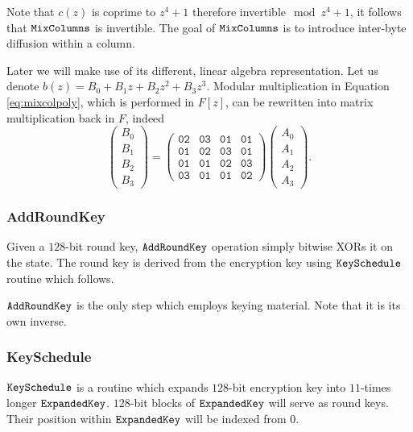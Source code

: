 	Note that $c(z)$ is coprime to $z^4+1$ therefore invertible$\mod{z^4+1}$, it follows that $\texttt{MixColumns}$ is invertible. 
	The goal of $\texttt{MixColumns}$ is to introduce inter-byte diffusion within a column.
	
	Later we will make use of its different, linear algebra representation. Let us denote $b(z) = B_0 + B_1 z + B_2 z^2 + B_3 z^3$. Modular multiplication in Equation \ref{eq:mixcolpoly}, which is performed in $F[z]$, can be rewritten into matrix multiplication back in $F$, indeed
	\begin{equation}
	\label{eq:mixcolmatr}
		\begin{pmatrix}
			B_0 \\ B_1 \\ B_2 \\ B_3
		\end{pmatrix}
		=
		\begin{pmatrix}
			\texttt{02} & \texttt{03} & \texttt{01} & \texttt{01} \\
			\texttt{01} & \texttt{02} & \texttt{03} & \texttt{01} \\
			\texttt{01} & \texttt{01} & \texttt{02} & \texttt{03} \\
			\texttt{03} & \texttt{01} & \texttt{01} & \texttt{02}
		\end{pmatrix}
		\begin{pmatrix}
			A_0 \\ A_1 \\ A_2 \\ A_3
		\end{pmatrix}.
	\end{equation}

\subsubsection{AddRoundKey}
	
	Given a $128$-bit round key, $\texttt{AddRoundKey}$ operation simply bitwise XORs it on the state. The round key is derived from the encryption key using $\texttt{KeySchedule}$ routine which follows.
	
	$\texttt{AddRoundKey}$ is the only step which employs keying material. Note that it is its own inverse.

\subsubsection{KeySchedule}
	
	$\texttt{KeySchedule}$ is a routine which expands $128$-bit encryption key into $11$-times longer $\texttt{ExpandedKey}$. $128$-bit blocks of $\texttt{ExpandedKey}$ will serve as round keys. Their position within $\texttt{ExpandedKey}$ will be indexed from $0$.
	
